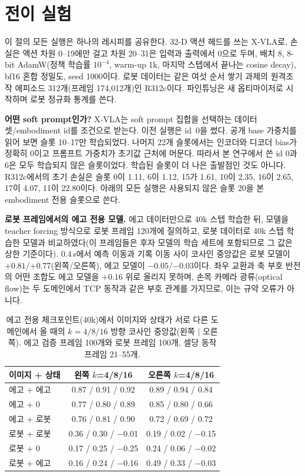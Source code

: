\documentclass[conference,10pt]{IEEEtran}
\begin{document}
\section{전이 실험}\label{p1:sec:transfer}
이 절의 모든 실행은 하나의 레시피를 공유한다. 32-D 액션 헤드를 쓰는 X-VLA로, 손실은 액션 차원 0--19에만 걸고 차원 20--31은 입력과
출력에서 0으로 두며, 배치 8, 8-bit AdamW(정책 학습률 $10^{-4}$, warm-up 1k, 마지막 스텝에서 끝나는 cosine decay), bf16 혼합 정밀도,
seed 1000이다. 로봇 데이터는 같은 여섯 순서 쌓기 과제의 원격조작 에피소드 312개(프레임 174{,}012개)인 R312c이다. 파인튜닝은 새
옵티마이저로 시작하며 로봇 정규화 통계를 쓴다.

\textbf{어떤 soft prompt인가?} X-VLA는 soft prompt 집합을 선택하는 데이터셋/embodiment id를 조건으로 받는다. 이전 실행은 id~0을
썼다. 공개 base 가중치를 읽어 보면 슬롯 10--17만 학습되었다. 나머지 22개 슬롯에서는 인코더와 디코더 bias가 정확히 0이고 프롬프트
가중치가 초기값 근처에 머문다. 따라서 본 연구에서 쓴 id 0과 6은 모두 학습되지 않은 슬롯이었다. 학습된 슬롯이 더 나은 출발점인 것도
아니다. R312c에서의 초기 손실은 슬롯 0이 1.11, 6이 1.12, 15가 1.61, 10이 2.35, 16이 2.65, 17이 4.07, 11이 22.80이다. 아래의 모든 실행은
사용되지 않은 슬롯 20을 본 embodiment 전용 슬롯으로 쓴다.

\textbf{로봇 프레임에서의 에고 전용 모델.} 에고 데이터만으로 40k 스텝 학습한 뒤, 모델을 teacher forcing 방식으로 로봇 프레임 120개에
질의하고, 로봇 데이터로 40k 스텝 학습한 모델과 비교하였다(이 프레임들은 후자 모델의 학습 세트에 포함되므로 그 값은 상한 기준이다).
0.4\,s에서 예측 이동과 기록 이동 사이 코사인 중앙값은 로봇 모델이 $+0.81$/$+0.77$(왼쪽/오른쪽), 에고 모델이 $-0.05$/$-0.03$이다.
좌우 교환과 축 부호 반전의 어떤 조합도 에고 모델을 $+0.16$ 위로 올리지 못하며, 손목 카메라 광류(optical flow)는 두 도메인에서 TCP
동작과 같은 부호 관계를 가지므로, 이는 규약 오류가 아니다.

\begin{table}[t]
\centering\footnotesize\setlength{\tabcolsep}{3.2pt}
\caption{에고 전용 체크포인트(40k)에서 이미지와 상태가 서로 다른 도메인에서 올 때의 $k{=}4/8/16$ 방향 코사인 중앙값(왼쪽 $|$ 오른쪽).
에고 검증 프레임 100개와 로봇 프레임 100개, 셀당 동작 프레임 21--55개.}
\label{p1:tab:ablation}
\begin{tabular}{@{}lcc@{}}
\toprule
이미지 + 상태 & 왼쪽 $k$=4/8/16 & 오른쪽 $k$=4/8/16 \\
\midrule
에고 + 에고 & 0.87 / 0.91 / 0.92 & 0.89 / 0.94 / 0.84 \\
에고 + 0 & 0.77 / 0.80 / 0.89 & 0.85 / 0.80 / 0.66 \\
에고 + 로봇 & 0.76 / 0.81 / 0.90 & 0.72 / 0.69 / 0.72 \\
로봇 + 로봇 & 0.36 / 0.30 / $-$0.01 & 0.19 / 0.02 / $-$0.15 \\
로봇 + 0 & 0.17 / 0.25 / $-$0.25 & 0.24 / 0.06 / $-$0.02 \\
로봇 + 에고 & 0.16 / 0.24 / $-$0.16 & 0.49 / 0.33 / $-$0.03 \\
\bottomrule
\end{tabular}
\end{table}
\end{document}
